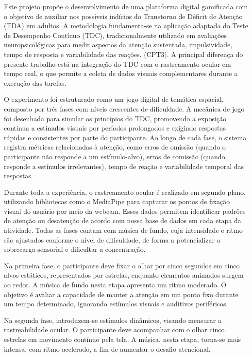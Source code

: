 Este projeto propõe o desenvolvimento de uma plataforma digital gamificada com o objetivo
de auxiliar nos possíveis indícios do Transtorno de Déficit de Atenção (TDA) em adultos. A
metodologia fundamenta-se na aplicação adaptada do Teste de Desempenho Contínuo
(TDC), tradicionalmente utilizado em avaliações neuropsicológicas para medir aspectos da
atenção sustentada, impulsividade, tempo de resposta e variabilidade das reações. (CPT3). A
principal diferença do presente trabalho está na integração do TDC com o rastreamento
ocular em tempo real, o que permite a coleta de dados visuais complementares durante a
execução das tarefas.

O experimento foi estruturado como um jogo digital de temática espacial, composto por três
fases com níveis crescentes de dificuldade. A mecânica de jogo foi desenhada para simular
os princípios do TDC, promovendo a exposição contínua a estímulos visuais por períodos
prolongados e exigindo respostas rápidas e consistentes por parte do participante. Ao longo
de cada fase, o sistema registra métricas relacionadas à atenção, como erros de omissão
(quando o participante não responde a um estímulo-alvo), erros de comissão (quando
responde a estímulos irrelevantes), tempo de reação e variabilidade temporal das respostas.

Durante toda a experiência, o rastreamento ocular é realizado em segundo plano, utilizando
bibliotecas como o MediaPipe para capturar os pontos de fixação visual do usuário por meio
da webcam. Esses dados permitem identificar padrões de atenção ou desatenção de acordo
com nossa base de dados em cada etapa da atividade. Todas as fases contam com música
de fundo, cuja intensidade e ritmo são ajustados conforme o nível de dificuldade, de forma a
potencializar a sobrecarga sensorial e dificultar a concentração.

Na primeira fase, o participante deve fixar o olhar por cinco segundos em cinco alvos
estáticos, representados por estrelas, enquanto elementos animados surgem ao redor. A
música de fundo nesta etapa apresenta um ritmo moderado. O objetivo é avaliar a
capacidade de manter a atenção em um ponto fixo durante um tempo determinado,
ignorando estímulos visuais e auditivos periféricos.

Na segunda fase, introduzem-se estímulos dinâmicos, visando mensurar a rastreabilidade
ocular. O participante deve acompanhar com o olhar cinco estrelas em movimento contínuo
pela tela. A música, nesta etapa, torna-se mais intensa, com ritmo acelerado, a fim de
aumentar o desafio atencional.

